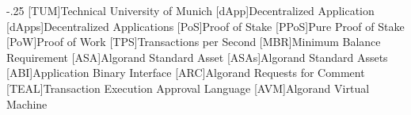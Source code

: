 \documentclass[headsepline,footsepline,footinclude=false,oneside,fontsize=11pt,paper=a4,listof=totoc,bibliography=totoc,parskip=half]{scrbook} %
\begin{document}


\frontmatter{}





\tableofcontents{}

\mainmatter{}








\appendix{}


\begin{acronym}
	\itemsep-.25\baselineskip
	[TUM]{Technical University of Munich}
	[dApp]{Decentralized Application}
	[dApps]{Decentralized Applications}
	[PoS]{Proof of Stake}
	[PPoS]{Pure Proof of Stake}
	[PoW]{Proof of Work}
	[TPS]{Transactions per Second}
	[MBR]{Minimum Balance Requirement}
	[ASA]{Algorand Standard Asset}
	[ASAs]{Algorand Standard Assets}
	[ABI]{Application Binary Interface}
	[ARC]{Algorand Requests for Comment}
	[TEAL]{Transaction Execution Approval Language}
	[AVM]{Algorand Virtual Machine}
\end{acronym}

\listoffigures{}
\listoftables{}
\printbibliography{}
\end{document}
